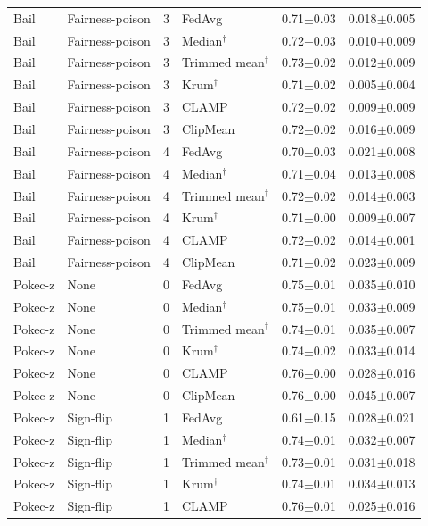 \begin{longtable}{llclcc}
Bail & Fairness-poison & 3 & FedAvg & 0.71$\pm$0.03 & 0.018$\pm$0.005 \\
Bail & Fairness-poison & 3 & Median$^\dagger$ & 0.72$\pm$0.03 & 0.010$\pm$0.009 \\
Bail & Fairness-poison & 3 & Trimmed mean$^\dagger$ & 0.73$\pm$0.02 & 0.012$\pm$0.009 \\
Bail & Fairness-poison & 3 & Krum$^\dagger$ & 0.71$\pm$0.02 & 0.005$\pm$0.004 \\
Bail & Fairness-poison & 3 & CLAMP & 0.72$\pm$0.02 & 0.009$\pm$0.009 \\
Bail & Fairness-poison & 3 & ClipMean & 0.72$\pm$0.02 & 0.016$\pm$0.009 \\
Bail & Fairness-poison & 4 & FedAvg & 0.70$\pm$0.03 & 0.021$\pm$0.008 \\
Bail & Fairness-poison & 4 & Median$^\dagger$ & 0.71$\pm$0.04 & 0.013$\pm$0.008 \\
Bail & Fairness-poison & 4 & Trimmed mean$^\dagger$ & 0.72$\pm$0.02 & 0.014$\pm$0.003 \\
Bail & Fairness-poison & 4 & Krum$^\dagger$ & 0.71$\pm$0.00 & 0.009$\pm$0.007 \\
Bail & Fairness-poison & 4 & CLAMP & 0.72$\pm$0.02 & 0.014$\pm$0.001 \\
Bail & Fairness-poison & 4 & ClipMean & 0.71$\pm$0.02 & 0.023$\pm$0.009 \\
Pokec-z & None & 0 & FedAvg & 0.75$\pm$0.01 & 0.035$\pm$0.010 \\
Pokec-z & None & 0 & Median$^\dagger$ & 0.75$\pm$0.01 & 0.033$\pm$0.009 \\
Pokec-z & None & 0 & Trimmed mean$^\dagger$ & 0.74$\pm$0.01 & 0.035$\pm$0.007 \\
Pokec-z & None & 0 & Krum$^\dagger$ & 0.74$\pm$0.02 & 0.033$\pm$0.014 \\
Pokec-z & None & 0 & CLAMP & 0.76$\pm$0.00 & 0.028$\pm$0.016 \\
Pokec-z & None & 0 & ClipMean & 0.76$\pm$0.00 & 0.045$\pm$0.007 \\
Pokec-z & Sign-flip & 1 & FedAvg & 0.61$\pm$0.15 & 0.028$\pm$0.021 \\
Pokec-z & Sign-flip & 1 & Median$^\dagger$ & 0.74$\pm$0.01 & 0.032$\pm$0.007 \\
Pokec-z & Sign-flip & 1 & Trimmed mean$^\dagger$ & 0.73$\pm$0.01 & 0.031$\pm$0.018 \\
Pokec-z & Sign-flip & 1 & Krum$^\dagger$ & 0.74$\pm$0.01 & 0.034$\pm$0.013 \\
Pokec-z & Sign-flip & 1 & CLAMP & 0.76$\pm$0.01 & 0.025$\pm$0.016 \\

\end{longtable}
